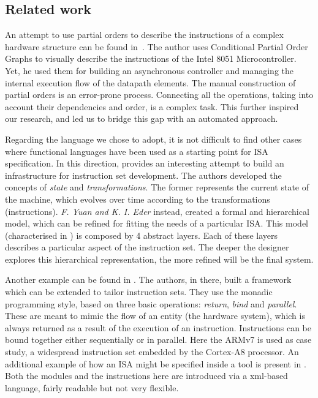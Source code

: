 \documentclass[conference]{IEEEtran}
\begin{document}
\subsection{Related work}

An attempt to use partial orders to describe the instructions of a complex hardware
structure can be found in~\cite{maxPhd}. The author uses Conditional Partial Order
Graphs to visually describe the instructions of the Intel 8051 Microcontroller.
Yet, he used them for building an asynchronous controller and managing the internal
execution flow of the datapath elements. The manual construction of partial orders
is an error-prone process. Connecting all the operations, taking into account their
dependencies and order, is a complex task. This further inspired our research, and
led us to bridge this gap with an automated approach.

Regarding the language we chose to adopt, it is not difficult to find other cases
where functional languages have been used as a starting point for ISA
specification. In this direction, \cite{isaFunc} provides an interesting attempt to
build an infrastructure for instruction set development. The authors developed the
concepts of \textit{state} and \textit{transformations}. The former represents the
current state of the machine, which evolves over time according to the
transformations (instructions). \textit{F. Yuan and K. I. Eder} instead, created a
formal and hierarchical model, which can be refined for fitting the needs of a
particular ISA. This model (characterised in \cite{isaEventB}) is composed by 4
abstract layers. Each of these layers describes a particular aspect of the
instruction set. The deeper the designer explores this hierarchical representation,
the more refined will be the final system.

Another example can be found in \cite{armv7}. The authors, in there, built a framework
which can be extended to tailor instruction sets. They use the monadic programming
style, based on three basic operations: \textit{return}, \textit{bind} and
\textit{parallel}. These are meant to mimic the flow of an entity (the hardware
system), which is always returned as a result of the execution of an instruction.
Instructions can be bound together either sequentially or in parallel. Here the
ARMv7 is used as case study, a widespread instruction set embedded by the 
Cortex-A8 processor. An additional example of how an ISA might be specified inside
a tool is present in \cite{isaXml}. Both the modules and the instructions here are
introduced via a xml-based language, fairly readable but not very flexible.
\end{document}
